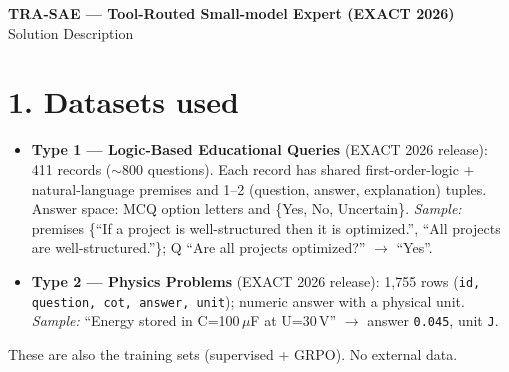 \documentclass[8pt]{extarticle}
\begin{document}
\begin{center}
{\Large\textbf{TRA-SAE — Tool-Routed Small-model Expert (EXACT 2026)}}\\[1pt]
{\small Solution Description}
\end{center}
\vspace{-4pt}

\section*{1. Datasets used}
\begin{itemize}
\item \textbf{Type 1 — Logic-Based Educational Queries} (EXACT 2026 release):
411 records ($\sim$800 questions). Each record has shared first-order-logic +
natural-language premises and 1--2 (question, answer, explanation) tuples.
Answer space: MCQ option letters and \{Yes, No, Uncertain\}.
\textit{Sample:} premises \{``If a project is well-structured then it is
optimized.'', ``All projects are well-structured.''\}; Q ``Are all projects
optimized?'' $\rightarrow$ ``Yes''.
\item \textbf{Type 2 — Physics Problems} (EXACT 2026 release): 1{,}755 rows
(\texttt{id, question, cot, answer, unit}); numeric answer with a physical unit.
\textit{Sample:} ``Energy stored in C=100\,$\mu$F at U=30\,V'' $\rightarrow$
answer \texttt{0.045}, unit \texttt{J}.
\end{itemize}
These are also the training sets (supervised + GRPO). No external data.
\end{document}
